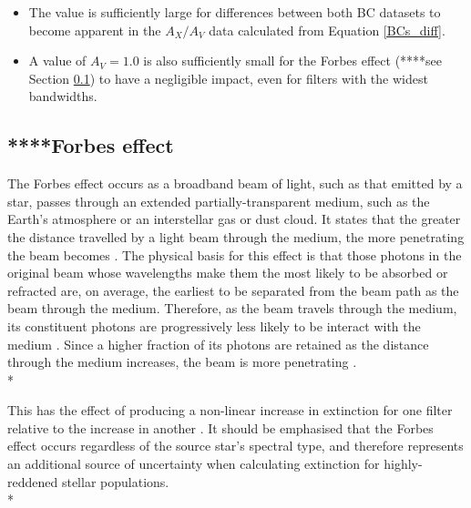 \documentclass[12pt, a4paper]{report}
\begin{document}
\begin{itemize}
\item The value is sufficiently large for differences between both BC datasets to become apparent in the $A_{X}/A_{V}$ data calculated from Equation \ref{BCs_diff}.
\item A value of $A_{V} = 1.0$ is also sufficiently small for the Forbes effect (****see Section \ref{forbes}) to have a negligible impact, even for filters with the widest bandwidths.
\end{itemize}

\subsection{****Forbes effect} \label{forbes}
The Forbes effect occurs as a broadband beam of light, such as that emitted by a star, passes through an extended partially-transparent medium, such as the Earth's atmosphere or an interstellar gas or dust cloud. It states that the greater the distance travelled by a light beam through the medium, the more penetrating the beam becomes \citep{1842RSPT..132..225F}. The physical basis for this effect is that those photons in the original beam whose wavelengths make them the most likely to be absorbed or refracted are, on average, the earliest to be separated from the beam path as the beam through the medium. Therefore, as the beam travels through the medium, its constituent photons are progressively less likely to be interact with the medium \citep{1995A&AS..109..293G}. Since a higher fraction of its photons are retained as the distance through the medium increases, the beam is more penetrating \citep{OHVRIL1999305}.\\*

This has the effect of producing a non-linear increase in extinction for one filter relative to the increase in another \citep{1995A&AS..109..293G,2008PASP..120..583G}. It should be emphasised that the Forbes effect occurs regardless of the source star's spectral type, and therefore represents an additional source of uncertainty when calculating extinction for highly-reddened stellar populations. \\*
\end{document}

